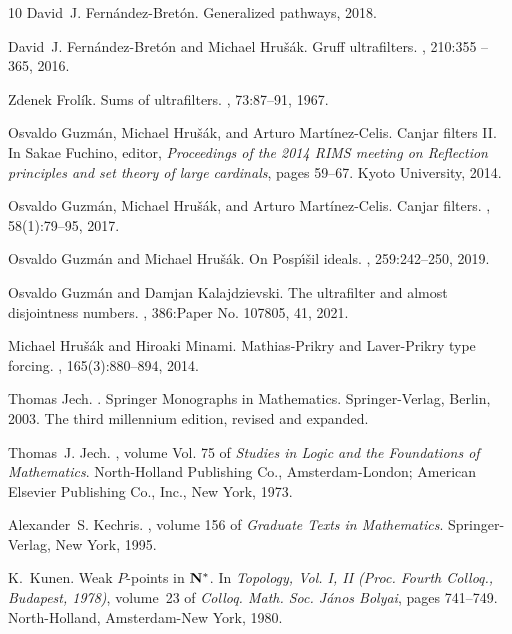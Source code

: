 \documentclass{article}%
\begin{document}
\begin{thebibliography}{10}
David~J. Fernández-Bretón.
\newblock Generalized pathways, 2018.

David~J. Fernández-Bretón and Michael Hru{\v{s}}{\'a}k.
\newblock Gruff ultrafilters.
, 210:355 -- 365, 2016.

Zdenek Frol\'ik.
\newblock Sums of ultrafilters.
, 73:87--91, 1967.

Osvaldo Guzm\'an, Michael Hru{\v{s}}{\'a}k, and Arturo Mart\'inez-Celis.
\newblock Canjar filters {I}{I}.
\newblock In Sakae Fuchino, editor, {\em Proceedings of the 2014 RIMS meeting
  on Reflection principles and set theory of large cardinals}, pages 59--67.
  Kyoto University, 2014.

Osvaldo Guzm\'an, Michael Hru{\v{s}}{\'a}k, and Arturo Mart\'inez-Celis.
\newblock Canjar filters.
, 58(1):79--95, 2017.

Osvaldo Guzm\'{a}n and Michael Hru\v{s}\'{a}k.
\newblock On {P}osp\'{\i}\v{s}il ideals.
, 259:242--250, 2019.

Osvaldo Guzm\'{a}n and Damjan Kalajdzievski.
\newblock The ultrafilter and almost disjointness numbers.
, 386:Paper No. 107805, 41, 2021.

Michael Hru{\v{s}}{\'a}k and Hiroaki Minami.
\newblock Mathias-{P}rikry and {L}aver-{P}rikry type forcing.
, 165(3):880--894, 2014.

Thomas Jech.
.
\newblock Springer Monographs in Mathematics. Springer-Verlag, Berlin, 2003.
\newblock The third millennium edition, revised and expanded.

Thomas~J. Jech.
, volume Vol. 75 of {\em Studies in Logic
  and the Foundations of Mathematics}.
\newblock North-Holland Publishing Co., Amsterdam-London; American Elsevier
  Publishing Co., Inc., New York, 1973.

Alexander~S. Kechris.
, volume 156 of {\em Graduate
  Texts in Mathematics}.
\newblock Springer-Verlag, New York, 1995.

K.~Kunen.
\newblock Weak {$P$}-points in {${\bf N}^{\ast} $}.
\newblock In {\em Topology, {V}ol. {I}, {II} ({P}roc. {F}ourth {C}olloq.,
  {B}udapest, 1978)}, volume~23 of {\em Colloq. Math. Soc. J\'{a}nos Bolyai},
  pages 741--749. North-Holland, Amsterdam-New York, 1980.


\end{thebibliography}
\end{document}
